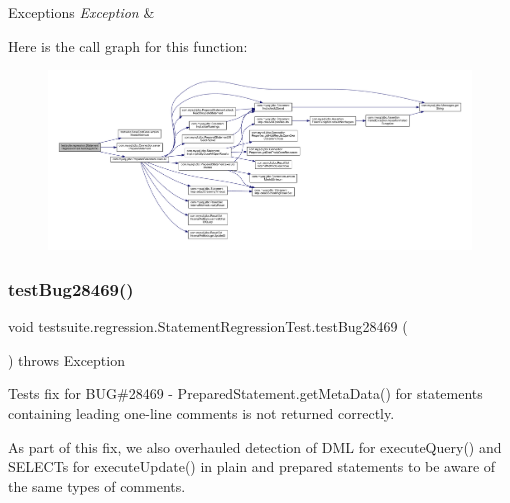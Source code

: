 \begin{DoxyExceptions}{Exceptions}
{\em Exception} & \\
\hline
\end{DoxyExceptions}
Here is the call graph for this function\+:
\nopagebreak
\begin{figure}[H]
\begin{center}
\leavevmode
\includegraphics[width=350pt]{classtestsuite_1_1regression_1_1_statement_regression_test_a45f6666d2a8fbbc59bb210cd6e6f33a5_cgraph}
\end{center}
\end{figure}
\mbox{\label{classtestsuite_1_1regression_1_1_statement_regression_test_aa43369797070b07cf82bd806ef218255}} 
\subsubsection{\texorpdfstring{test\+Bug28469()}{testBug28469()}}
{\footnotesize\ttfamily void testsuite.\+regression.\+Statement\+Regression\+Test.\+test\+Bug28469 (\begin{DoxyParamCaption}{ }\end{DoxyParamCaption}) throws Exception}

Tests fix for B\+UG\#28469 -\/ Prepared\+Statement.\+get\+Meta\+Data() for statements containing leading one-\/line comments is not returned correctly.

As part of this fix, we also overhauled detection of D\+ML for execute\+Query() and S\+E\+L\+E\+C\+Ts for execute\+Update() in plain and prepared statements to be aware of the same types of comments.


